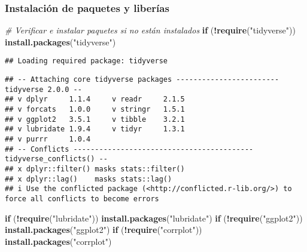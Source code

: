 \documentclass[
]{article}
\newenvironment{Shaded}{\begin{snugshade}}{\end{snugshade}}
\newcommand{\CommentTok}[1]{\textcolor[rgb]{0.56,0.35,0.01}{\textit{#1}}}
\newcommand{\ControlFlowTok}[1]{\textcolor[rgb]{0.13,0.29,0.53}{\textbf{#1}}}
\newcommand{\FunctionTok}[1]{\textcolor[rgb]{0.13,0.29,0.53}{\textbf{#1}}}
\newcommand{\NormalTok}[1]{#1}
\newcommand{\SpecialCharTok}[1]{\textcolor[rgb]{0.81,0.36,0.00}{\textbf{#1}}}
\newcommand{\StringTok}[1]{\textcolor[rgb]{0.31,0.60,0.02}{#1}}
\begin{document}
\subsubsection{Instalación de paquetes y
liberías}\label{instalaciuxf3n-de-paquetes-y-liberuxedas}

\begin{Shaded}
\begin{Highlighting}[]
\CommentTok{\# Verificar e instalar paquetes si no están instalados}
\ControlFlowTok{if}\NormalTok{ (}\SpecialCharTok{!}\FunctionTok{require}\NormalTok{(}\StringTok{"tidyverse"}\NormalTok{)) }\FunctionTok{install.packages}\NormalTok{(}\StringTok{"tidyverse"}\NormalTok{)}
\end{Highlighting}
\end{Shaded}

\begin{verbatim}
## Loading required package: tidyverse
\end{verbatim}

\begin{verbatim}
## -- Attaching core tidyverse packages ------------------------ tidyverse 2.0.0 --
## v dplyr     1.1.4     v readr     2.1.5
## v forcats   1.0.0     v stringr   1.5.1
## v ggplot2   3.5.1     v tibble    3.2.1
## v lubridate 1.9.4     v tidyr     1.3.1
## v purrr     1.0.4     
## -- Conflicts ------------------------------------------ tidyverse_conflicts() --
## x dplyr::filter() masks stats::filter()
## x dplyr::lag()    masks stats::lag()
## i Use the conflicted package (<http://conflicted.r-lib.org/>) to force all conflicts to become errors
\end{verbatim}

\begin{Shaded}
\begin{Highlighting}[]
\ControlFlowTok{if}\NormalTok{ (}\SpecialCharTok{!}\FunctionTok{require}\NormalTok{(}\StringTok{"lubridate"}\NormalTok{)) }\FunctionTok{install.packages}\NormalTok{(}\StringTok{"lubridate"}\NormalTok{)}
\ControlFlowTok{if}\NormalTok{ (}\SpecialCharTok{!}\FunctionTok{require}\NormalTok{(}\StringTok{"ggplot2"}\NormalTok{)) }\FunctionTok{install.packages}\NormalTok{(}\StringTok{"ggplot2"}\NormalTok{)}
\ControlFlowTok{if}\NormalTok{ (}\SpecialCharTok{!}\FunctionTok{require}\NormalTok{(}\StringTok{"corrplot"}\NormalTok{)) }\FunctionTok{install.packages}\NormalTok{(}\StringTok{"corrplot"}\NormalTok{)}
\end{Highlighting}
\end{Shaded}
\end{document}
